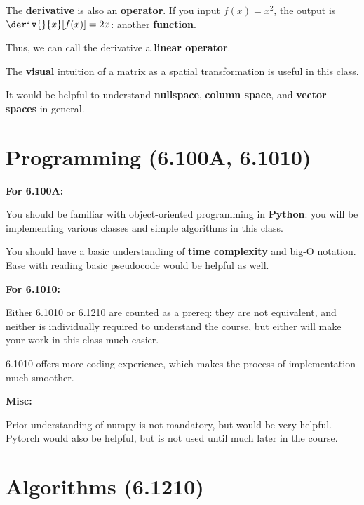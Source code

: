         
    
    \miniex The \textbf{derivative} is also an \textbf{operator}. If you input $f(x) = x^2$, the output is $\deriv{}{x}[f(x)]=2x$: another \textbf{function}.
    
    Thus, we can call the derivative a \textbf{linear operator}.
    
    
    The \textbf{visual} intuition of a matrix as a spatial transformation is useful in this class. 
    
    It would be helpful to understand \textbf{nullspace}, \textbf{column space}, and \textbf{vector spaces} in general.
    
\section{Programming (6.100A, 6.1010)}
    
    \textbf{For 6.100A:}
    
    You should be familiar with object-oriented programming in \textbf{Python}: you will be implementing various classes and simple algorithms in this class.
    
    You should have a basic understanding of \textbf{time complexity} and big-O notation. Ease with reading basic pseudocode would be helpful as well.
    
    
    
    \textbf{For 6.1010:}
    
    Either 6.1010 or 6.1210 are counted as a prereq: they are not equivalent, and neither is individually required to understand the course, but either will make your work in this class much easier.
    
    6.1010 offers more coding experience, which makes the process of implementation much smoother.
    
    \textbf{Misc:}
    
    Prior understanding of numpy is not mandatory, but would be very helpful. Pytorch would also be helpful, but is not used until much later in the course.
    
\section{Algorithms (6.1210)}
    
